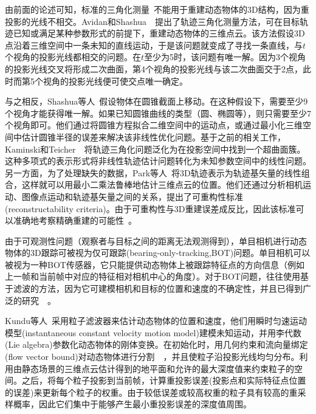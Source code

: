 由前面的论述可知，标准的三角化测量~\cite{hartley1997triangulation}不能用于重建动态物体的3D结构，因为重投影的光线不相交。Avidan和Shashua~\cite{avidan1999trajectory}~\cite{avidan2000trajectory}提出了轨迹三角化测量方法，可在目标轨迹已知或满足某种参数形式的前提下，重建动态物体的三维点云。该方法假设3D点沿着三维空间中一条未知的直线运动，于是该问题就变成了寻找一条直线，与$t$个视角的投影光线都相交的问题。在$t$至少为5时，该问题有唯一解。因为3个视角的投影光线交叉将形成二次曲面，第4个视角的投影光线与该二次曲面交于2点，此时而第5个视角的投影光线便可使交点唯一确定。

与之相反，Shashua等人~\cite{shashua1999trajectory}假设物体在圆锥截面上移动。在这种假设下，需要至少9个视角才能获得唯一解。如果已知圆锥曲线的类型（圆、椭圆等），则只需要至少7个视角即可。他们通过将圆锥方程拟合二维空间中的运动点，或通过最小化三维空间中估计圆锥半径的误差来解决该非线性优化问题。基于之前的相关工作，Kaminski和Teicher~\cite{kaminski2002general}~\cite{kaminski2004general}将轨迹三角化问题泛化为在投影空间中找到一个超曲面簇。这种多项式的表示形式将非线性轨迹估计问题转化为未知参数空间中的线性问题。另一方面，为了处理缺失的数据，Park等人~\cite{park20103d}将3D轨迹表示为轨迹基矢量的线性组合，这样就可以用最小二乘法鲁棒地估计三维点云的位置。他们还通过分析相机运动、图像点运动和轨迹基矢量之间的关系，提出了可重构性标准(reconstructability criteria)。由于可重构性与3D重建误差成反比，因此该标准可以准确地考察精确重建的可能性~\cite{park20153d}。

由于可观测性问题（观察者与目标之间的距离无法观测得到），单目相机进行动态物体的3D跟踪可被视为仅可跟踪(bearing-only-tracking,BOT)问题。单目相机可以被视为一种BOT传感器，它只能提供动态物体上被跟踪特征点的方向信息（例如上一帧和当前帧中对应的特征相对相机中心的角度）。对于BOT问题，往往使用基于滤波的方法，因为它可建模相机和目标的位置和速度的不确定性，并且已得到广泛的研究~\cite{aidala1983utilization}~\cite{le1998bearings}。

Kundu等人~\cite{kundu2011realtime}采用粒子滤波器来估计动态物体的位置和速度，他们用瞬时匀速运动模型(instantaneous constant velocity motion model)建模未知运动，并用李代数(Lie algebra)参数化动态物体的刚体变换。在初始化时，用几何约束和流向量绑定(flow vector bound)对动态物体进行分割~\cite{kundu2009movingA}~\cite{kundu2010realtime}，并且使粒子沿投影光线均匀分布。利用由静态场景的三维点云估计得到的地平面和允许的最大深度值来约束粒子的空间。之后，将每个粒子投影到当前帧，计算重投影误差(投影点和实际特征点位置的误差)来更新每个粒子的权重。由于较低误差或较高权重的粒子具有较高的重采样概率，因此它们集中于能够产生最小重投影误差的深度值周围。